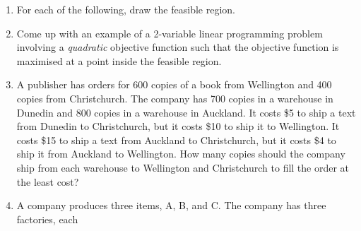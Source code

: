 \documentclass[a4paper,leqno]{article}
\numberwithin{equation}{section}
\theoremstyle{definition}
\theoremstyle{remark}
\begin{document}
\begin{enumerate}
  \item For each of the following, draw the feasible region.
    \begin{center}
      \hspace*{\fill}
    \end{center}
  \item Come up with an example of a 2-variable linear programming problem involving a \emph{quadratic} objective function
        such that the objective function is maximised at a point inside the feasible region.
  \item A publisher has orders for 600 copies of a book from Wellington and 400 copies from Christchurch. The company has 700 copies in
        a warehouse in Dunedin and 800 copies in a warehouse in Auckland. It costs \$5 to ship a text from Dunedin to Christchurch, but
        it costs \$10 to ship it to Wellington. It costs \$15 to ship a text from Auckland to Christchurch, but it costs \$4 to ship it from
        Auckland to Wellington. How many copies should the company ship from each warehouse to Wellington and Christchurch to fill the
        order at the least cost?
  \item A company produces three items, A, B, and C. The company has three factories, each

\end{enumerate}
\end{document}
